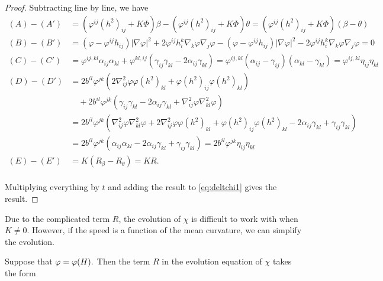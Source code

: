 \documentclass{amsart}
\begin{document}
\begin{proof}
Subtracting line by line, we have
\begin{align*}
(A) - (A') &= \left(\varphi^{ij}(h^2)_{ij} + K\Phi \right)\beta - \left(\varphi^{ij}(h^2)_{ij} + K\Phi \right)\theta = \left(\varphi^{ij}(h^2)_{ij} + K\Phi \right)(\beta - \theta) \\
(B) - (B') &= (\varphi - \varphi^{ij}h_{ij}) |\nabla\varphi|^{2} + 2\varphi^{ij}h^{k}_{i}\nabla_k \varphi \nabla_j \varphi - (\varphi - \varphi^{ij}h_{ij})|\nabla\varphi|^{2} - 2\varphi^{ij}h^{k}_{i}\nabla_k\varphi\nabla_j\varphi = 0 \\
(C) - (C') &= \varphi^{ij,kl} \alpha_{ij} \alpha_{kl} + \varphi^{kl,ij} (\gamma_{ij}\gamma_{kl}  - 2\alpha_{ij} \gamma_{kl}) = \varphi^{ij,kl} (\alpha_{ij} - \gamma_{ij}) (\alpha_{kl} - \gamma_{kl}) = \varphi^{ij,kl} \eta_{ij} \eta_{kl} \\
(D) - (D') &= 2b^{il}\varphi^{jk} (2\nabla^2_{ij}\varphi\varphi(h^2)_{kl} + \varphi(h^2)_{ij}\varphi(h^2)_{kl}) \\
&\quad + 2b^{il} \varphi^{jk} \left(\gamma_{ij} \gamma_{kl} - 2\alpha_{ij} \gamma_{kl} + \nabla^2_{ij}\varphi\nabla^2_{kl}\varphi\right) \\
&= 2b^{il}\varphi^{jk} \left(\nabla^2_{ij}\varphi\nabla^2_{kl}\varphi +2\nabla^2_{ij}\varphi\varphi(h^2)_{kl} + \varphi(h^2)_{ij}\varphi(h^2)_{kl} - 2 \alpha_{ij} \gamma_{kl} + \gamma_{ij} \gamma_{kl} \right) \\
&= 2b^{il}\varphi^{jk} \left(\alpha_{ij}\alpha_{kl} - 2 \alpha_{ij} \gamma_{kl} + \gamma_{ij} \gamma_{kl} \right) = 2b^{il}\varphi^{jk} \eta_{ij} \eta_{kl} \\
(E) - (E') &= K(R_{\beta} - R_{\theta}) = KR.\\
\end{align*}

Multiplying everything by \(t\) and adding the result to \cref{eq:deltchi1} gives the result.
\end{proof}

Due to the complicated term $R$, the evolution of \(\chi\) is difficult to work with when $K\ne 0$. However, if the speed is a function of the mean curvature, we can simplify the evolution.

\begin{lemma}\label{RSphere}
Suppose that $\varphi=\varphi(H).$ Then the term $R$ in the evolution equation of $\chi$ takes the form
\end{lemma}
\end{document}

